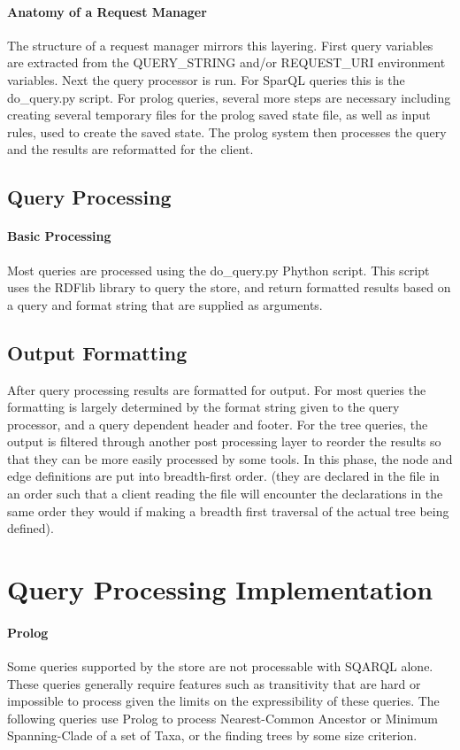 \documentclass[10pt]{article}
\begin{document}
     \paragraph{Anatomy of a Request Manager}
      The structure of a request manager mirrors this layering. First query variables are extracted from the QUERY\_STRING
      and/or REQUEST\_URI environment variables. 
      Next the query processor is run. For SparQL queries this is the do\_query.py script. For prolog queries, several more
      steps are necessary including creating several temporary files for the prolog saved state file, as well as input rules, 
      used to create the saved state. The prolog system then processes the query and the results are reformatted for the client.
  \subsection{Query Processing}
     \paragraph{Basic Processing} Most queries are processed using the do\_query.py Phython script. This script uses the RDFlib
     library to query the store, and return formatted results based on a query and format string that
     are supplied as arguments.
     
 
  \subsection{Output Formatting}
     After query processing results are formatted for output. For most queries the formatting is largely
     determined by the format string given to the query processor, and a query dependent header and footer.
     For the tree queries, the output is filtered through another post processing layer to reorder the 
     results so that they can be more easily processed by some tools. In this phase, the node and edge
     definitions are put into breadth-first order. (they are declared in the file in an order such that
     a client reading the file will encounter the declarations in the same order they would if making a
     breadth first traversal of the actual tree being defined).



\section{Query Processing Implementation}
    \paragraph{Prolog} Some queries supported by the store are not processable with SQARQL alone. These queries generally
      require features such as transitivity that are hard or impossible to process given the limits on the expressibility 
      of these queries. The following queries use Prolog to process Nearest-Common Ancestor or Minimum Spanning-Clade of a
      set of Taxa, or the finding trees by some size criterion. 
\end{document}

